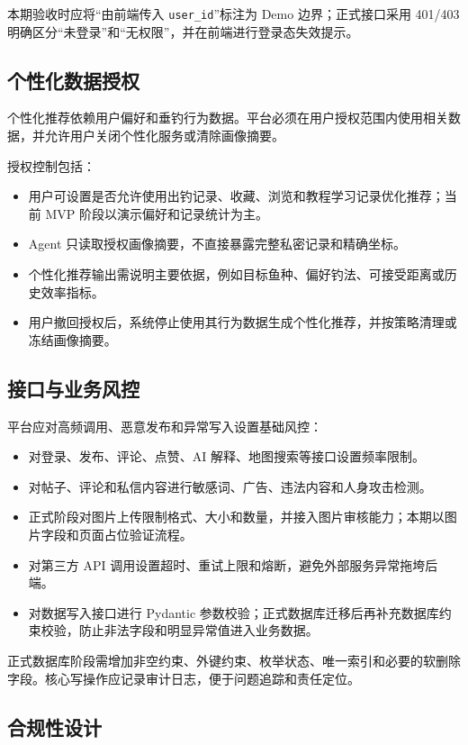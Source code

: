 本期验收时应将“由前端传入 \texttt{user\_id}”标注为 Demo 边界；正式接口采用 401/403 明确区分“未登录”和“无权限”，并在前端进行登录态失效提示。

\subsection{个性化数据授权}

个性化推荐依赖用户偏好和垂钓行为数据。平台必须在用户授权范围内使用相关数据，并允许用户关闭个性化服务或清除画像摘要。

授权控制包括：

\begin{itemize}
  \item 用户可设置是否允许使用出钓记录、收藏、浏览和教程学习记录优化推荐；当前 MVP 阶段以演示偏好和记录统计为主。
  \item Agent 只读取授权画像摘要，不直接暴露完整私密记录和精确坐标。
  \item 个性化推荐输出需说明主要依据，例如目标鱼种、偏好钓法、可接受距离或历史效率指标。
  \item 用户撤回授权后，系统停止使用其行为数据生成个性化推荐，并按策略清理或冻结画像摘要。
\end{itemize}

\subsection{接口与业务风控}

平台应对高频调用、恶意发布和异常写入设置基础风控：

\begin{itemize}
  \item 对登录、发布、评论、点赞、AI 解释、地图搜索等接口设置频率限制。
  \item 对帖子、评论和私信内容进行敏感词、广告、违法内容和人身攻击检测。
  \item 正式阶段对图片上传限制格式、大小和数量，并接入图片审核能力；本期以图片字段和页面占位验证流程。
  \item 对第三方 API 调用设置超时、重试上限和熔断，避免外部服务异常拖垮后端。
  \item 对数据写入接口进行 Pydantic 参数校验；正式数据库迁移后再补充数据库约束校验，防止非法字段和明显异常值进入业务数据。
\end{itemize}

正式数据库阶段需增加非空约束、外键约束、枚举状态、唯一索引和必要的软删除字段。核心写操作应记录审计日志，便于问题追踪和责任定位。

\subsection{合规性设计}

